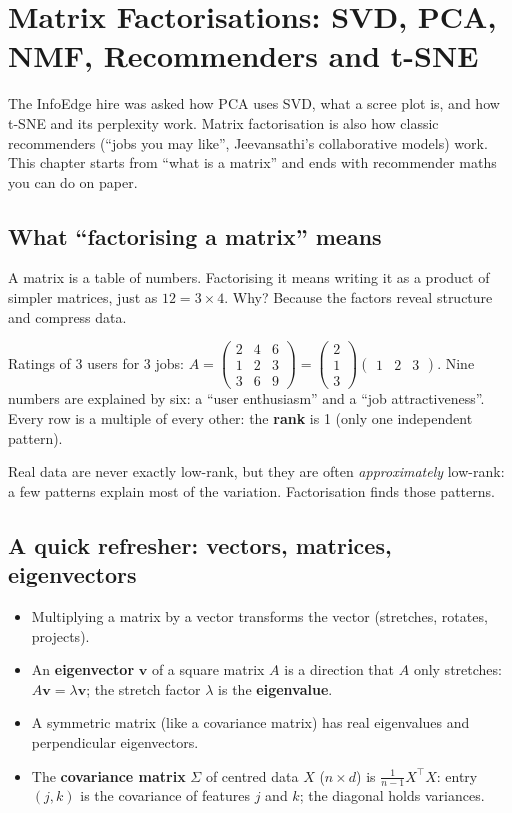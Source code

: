 \chapter{Matrix Factorisations: SVD, PCA, NMF, Recommenders and t-SNE}

The InfoEdge hire was asked how PCA uses SVD, what a scree plot is, and how t-SNE and its perplexity work. Matrix
factorisation is also how classic recommenders (``jobs you may like'', Jeevansathi's collaborative models) work. This chapter
starts from ``what is a matrix'' and ends with recommender maths you can do on paper.

\section{What ``factorising a matrix'' means}
A matrix is a table of numbers. Factorising it means writing it as a product of simpler matrices, just as $12 = 3\times4$.
Why? Because the factors reveal structure and compress data.

\begin{example}
Ratings of 3 users for 3 jobs:
$A = \begin{pmatrix}2 & 4 & 6\\1 & 2 & 3\\3 & 6 & 9\end{pmatrix} = \begin{pmatrix}2\\1\\3\end{pmatrix}\begin{pmatrix}1 & 2 & 3\end{pmatrix}$.
Nine numbers are explained by six: a ``user enthusiasm'' and a ``job attractiveness''. Every row is a multiple of every other: the
\textbf{rank} is 1 (only one independent pattern).
\end{example}
Real data are never exactly low-rank, but they are often \emph{approximately} low-rank: a few patterns explain most of the variation.
Factorisation finds those patterns.

\section{A quick refresher: vectors, matrices, eigenvectors}
\begin{itemize}
\item Multiplying a matrix by a vector transforms the vector (stretches, rotates, projects).
\item An \textbf{eigenvector} $\mathbf v$ of a square matrix $A$ is a direction that $A$ only stretches: $A\mathbf v = \lambda\mathbf v$; the
  stretch factor $\lambda$ is the \textbf{eigenvalue}.
\item A symmetric matrix (like a covariance matrix) has real eigenvalues and perpendicular eigenvectors.
\item The \textbf{covariance matrix} $\Sigma$ of centred data $X$ ($n\times d$) is $\frac{1}{n-1}X^\top X$: entry $(j,k)$ is the covariance of
  features $j$ and $k$; the diagonal holds variances.
\end{itemize}

